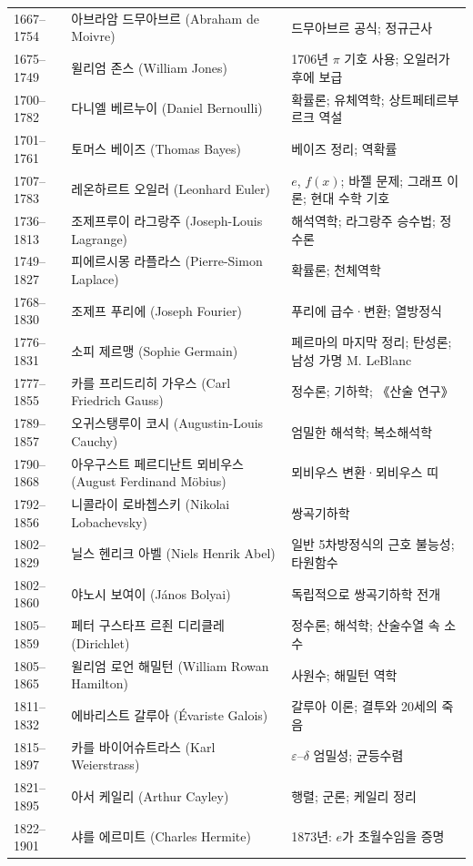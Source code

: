 \begin{center}
\begin{longtable}{@{}L{0.16\textwidth}L{0.24\textwidth}L{0.52\textwidth}@{}}
1667--1754 & 아브라암 드무아브르 (Abraham de Moivre) & 드무아브르 공식; 정규근사\\
1675--1749 & 윌리엄 존스 (William Jones) & 1706년 $\pi$ 기호 사용; 오일러가 후에 보급\\
1700--1782 & 다니엘 베르누이 (Daniel Bernoulli) & 확률론; 유체역학; 상트페테르부르크 역설\\
1701--1761 & 토머스 베이즈 (Thomas Bayes) & 베이즈 정리; 역확률\\
1707--1783 & 레온하르트 오일러 (Leonhard Euler) & $e$, $f(x)$; 바젤 문제; 그래프 이론; 현대 수학 기호\\
1736--1813 & 조제프루이 라그랑주 (Joseph-Louis Lagrange) & 해석역학; 라그랑주 승수법; 정수론\\
1749--1827 & 피에르시몽 라플라스 (Pierre-Simon Laplace) & 확률론; 천체역학\\
1768--1830 & 조제프 푸리에 (Joseph Fourier) & 푸리에 급수·변환; 열방정식\\
1776--1831 & 소피 제르맹 (Sophie Germain) & 페르마의 마지막 정리; 탄성론; 남성 가명 M. LeBlanc\\
1777--1855 & 카를 프리드리히 가우스 (Carl Friedrich Gauss) & 정수론; 기하학; 《산술 연구》\\
1789--1857 & 오귀스탱루이 코시 (Augustin-Louis Cauchy) & 엄밀한 해석학; 복소해석학\\
1790--1868 & 아우구스트 페르디난트 뫼비우스 (August Ferdinand Möbius) & 뫼비우스 변환·뫼비우스 띠\\
1792--1856 & 니콜라이 로바쳅스키 (Nikolai Lobachevsky) & 쌍곡기하학\\
1802--1829 & 닐스 헨리크 아벨 (Niels Henrik Abel) & 일반 5차방정식의 근호 불능성; 타원함수\\
1802--1860 & 야노시 보여이 (János Bolyai) & 독립적으로 쌍곡기하학 전개\\
1805--1859 & 페터 구스타프 르죈 디리클레 (Dirichlet) & 정수론; 해석학; 산술수열 속 소수\\
1805--1865 & 윌리엄 로언 해밀턴 (William Rowan Hamilton) & 사원수; 해밀턴 역학\\
1811--1832 & 에바리스트 갈루아 (Évariste Galois) & 갈루아 이론; 결투와 20세의 죽음\\
1815--1897 & 카를 바이어슈트라스 (Karl Weierstrass) & $\varepsilon$--$\delta$ 엄밀성; 균등수렴\\
1821--1895 & 아서 케일리 (Arthur Cayley) & 행렬; 군론; 케일리 정리\\
1822--1901 & 샤를 에르미트 (Charles Hermite) & 1873년: $e$가 초월수임을 증명\\

\end{longtable}
\end{center}
